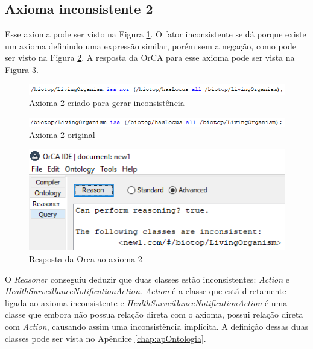 \documentclass{bcc}
\begin{document}
\subsection{Axioma inconsistente 2}
Esse axioma pode ser visto na Figura \ref{fig:axiomai_2}. O fator inconsistente se dá porque existe um axioma definindo uma expressão similar, porém sem a negação, como pode ser visto na Figura \ref{fig:axiomai_2_o}. A resposta da OrCA para esse axioma pode ser vista na Figura \ref{fig:axiomai_2_res}.

\begin{figure}[H]
\centering
\includegraphics[width=.9\textwidth]{Figuras/axiomai_2.png}
\caption{Axioma 2 criado para gerar inconsistência} 
\label{fig:axiomai_2}
\end{figure}

\begin{figure}[H]
\centering
\includegraphics[width=.9\textwidth]{Figuras/axiomai_2_o.png}
\caption{Axioma 2 original} 
\label{fig:axiomai_2_o}
\end{figure}

\begin{figure}[H]
\centering
\includegraphics[width=.6\textwidth]{Figuras/axiomai_2_res.png}
\caption{Resposta da Orca ao axioma 2} 
\label{fig:axiomai_2_res}
\end{figure}

O \textit{Reasoner} conseguiu deduzir que duas classes estão inconsistentes: \textit{Action} e \textit{HealthSurveillanceNotificationAction}. \textit{Action} é a classe que está diretamente ligada ao axioma inconsistente e \textit{HealthSurveillanceNotificationAction} é uma classe que embora não possua relação direta com o axioma, possui relação direta com \textit{Action}, causando assim uma inconsistência implícita. A definição dessas duas classes pode ser vista no Apêndice \ref{chap:apOntologia}.
\end{document}
